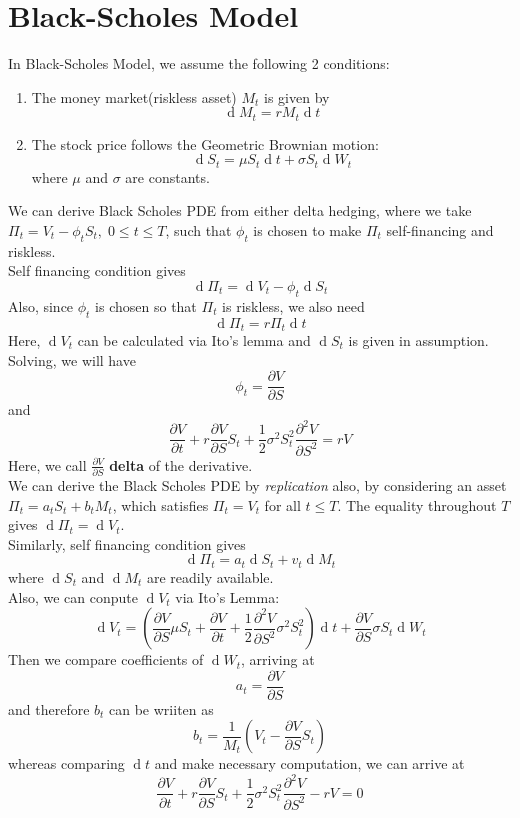 \documentclass[12pt]{article}
\theoremstyle{definition}
\DeclareMathOperator{\diff}{d}
\begin{document}
\section{Black-Scholes Model}
In Black-Scholes Model, we assume the following 2 conditions:
\begin{enumerate}
  \item The money market(riskless asset) $M_t$ is given by
  \[
\diff M_t = rM_t\diff t
  \]
  \item The stock price follows the Geometric Brownian motion:
  \[
\diff S_t = \mu S_t\diff t +\sigma S_t\diff W_t
  \]
  where $\mu$ and $\sigma$ are constants.
\end{enumerate}
We can derive Black Scholes PDE from either delta hedging, where we take $\Pi_t=V_t-\phi_tS_t, \;0\leq t\leq T$, such that $\phi_t$ is chosen to make $\Pi_t$ self-financing and riskless.\\
Self financing condition gives
\[
\diff \Pi_t=\diff V_t - \phi_t\diff S_t
\]
Also, since $\phi_t$ is chosen so that $\Pi_t$ is riskless, we also need
\[
\diff \Pi_t = r\Pi_t\diff t
\]
Here, $\diff V_t$ can be calculated via Ito's lemma and $\diff S_t$ is given in assumption. Solving, we will have
\[
\phi_t = \frac{\partial V}{\partial S}
\]
and
\[
\frac{\partial V}{\partial t}+r\frac{\partial V}{\partial S}S_t +\frac{1}{2}\sigma^2S_t^2\frac{\partial^2 V}{\partial S^2}=rV
\]
Here, we call $\frac{\partial V}{\partial S}$ \textbf{delta} of the derivative.\\
We can derive the Black Scholes PDE by \textit{replication} also, by considering an asset $\Pi_t=a_tS_t+b_tM_t$, which satisfies $\Pi_t=V_t$ for all $t\leq T$. The equality throughout $T$ gives $\diff \Pi_t=\diff V_t$.\\
Similarly, self financing condition gives
\[
\diff \Pi_t=a_t\diff S_t+v_t\diff M_t
\]
where $\diff S_t$ and $\diff M_t$ are readily available.\\
Also, we can conpute $\diff V_t$ via Ito's Lemma:
\[
\diff V_t = (\frac{\partial V}{\partial S}\mu S_t+\frac{\partial V}{\partial t}+\frac{1}{2}\frac{\partial^2V}{\partial S^2}\sigma^2S_t^2)\diff t+\frac{\partial V}{\partial S}\sigma S_t\diff W_t
\]
Then we compare coefficients of $\diff W_t$, arriving at
\[
a_t=\frac{\partial V}{\partial S}
\]
and therefore $b_t$ can be wriiten as
\[
b_t=\frac{1}{M_t}(V_t-\frac{\partial V}{\partial S}S_t)
\]
whereas comparing $\diff t$ and make necessary computation, we can arrive at
\[
\frac{\partial V}{\partial t}+r\frac{\partial V}{\partial S}S_t +\frac{1}{2}\sigma^2S_t^2\frac{\partial^2 V}{\partial S^2}-rV=0
\]
\end{document}
